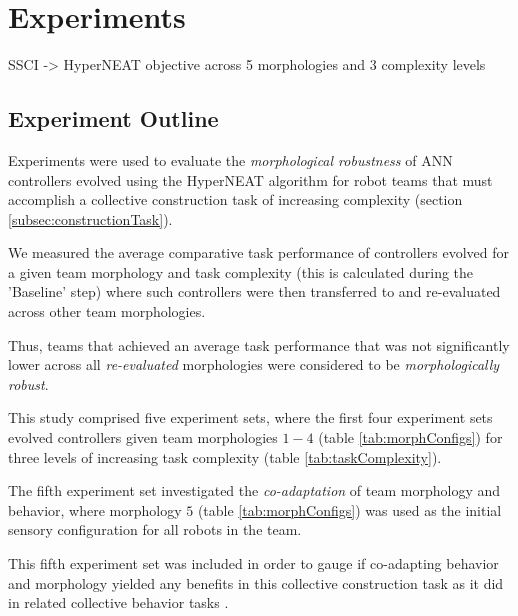 \chapter{Experiments}
\label{Chapter4}



SSCI -> HyperNEAT objective across 5 morphologies and 3 complexity levels

\section{Experiment Outline} \label{sec:experiment_outline}

Experiments were used to evaluate the \textit{morphological robustness} of ANN controllers evolved using the HyperNEAT algorithm for
robot teams that must accomplish a collective construction task of increasing
complexity (section \ref{subsec:constructionTask}).

We measured the average comparative task performance of controllers evolved
for a given team morphology and task complexity (this is calculated during the 'Baseline' step) where such controllers were
then transferred to
and re-evaluated across other team morphologies.

Thus, teams that achieved an average task performance that was not significantly lower
across all \textit{re-evaluated} morphologies were considered to be \textit{morphologically robust}.

This study comprised five experiment sets, where the first four experiment sets evolved
controllers given team morphologies $1-4$ (table \ref{tab:morphConfigs})
for three levels of increasing task complexity (table \ref{tab:taskComplexity}).

The fifth experiment set investigated the \textit{co-adaptation} of team morphology
and behavior, where morphology $5$ (table \ref{tab:morphConfigs}) was used
as the initial sensory configuration for all robots in the team.

This fifth experiment set was included in order to gauge if co-adapting behavior
and morphology yielded any benefits in this collective construction task as it did in related
collective behavior tasks \cite{HewlandNitschke2015}.

